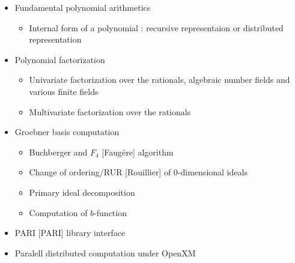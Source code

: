 \begin{slide}{}

\begin{itemize}
\item Fundamental polynomial arithmetics

\begin{itemize}
\item Internal form of a polynomial : recursive representaion or distributed
representation
\end{itemize}

\item Polynomial factorization

\begin{itemize}
\item Univariate factorization over the rationals, algebraic number fields and various finite fields

\item Multivariate factorization over the rationals
\end{itemize}

\item Groebner basis computation

\begin{itemize}
\item Buchberger and $F_4$ [Faug\'ere] algorithm

\item Change of ordering/RUR [Rouillier] of 0-dimensional ideals

\item Primary ideal decomposition

\item Computation of $b$-function
\end{itemize}

\item PARI [PARI] library interface 

\item Paralell distributed computation under OpenXM 
\end{itemize}
\end{slide}

